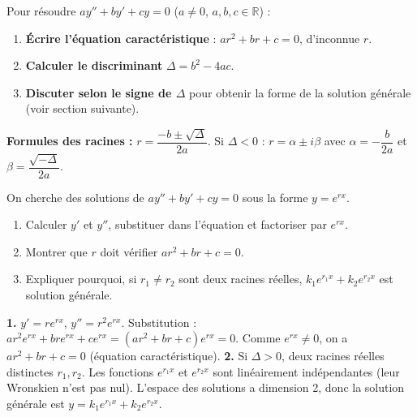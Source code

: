 \documentclass[11pt]{article}
\begin{document}
\begin{methode}
Pour résoudre $ay'' + by' + cy = 0$ ($a \neq 0$, $a,b,c \in \mathbb{R}$) :
\begin{enumerate}
\item \textbf{Écrire l'équation caractéristique} : $ar^2 + br + c = 0$, d'inconnue $r$.
\item \textbf{Calculer le discriminant} $\Delta = b^2 - 4ac$.
\item \textbf{Discuter selon le signe de $\Delta$} pour obtenir la forme de la solution générale (voir section suivante).
\end{enumerate}
\textbf{Formules des racines :} $r = \dfrac{-b \pm \sqrt{\Delta}}{2a}$.
Si $\Delta < 0$ : $r = \alpha \pm i\beta$ avec $\alpha = -\dfrac{b}{2a}$ et $\beta = \dfrac{\sqrt{-\Delta}}{2a}$.
\end{methode}

\begin{experience}
On cherche des solutions de $ay''+by'+cy=0$ sous la forme $y = e^{rx}$.
\begin{enumerate}
\item Calculer $y'$ et $y''$, substituer dans l'équation et factoriser par $e^{rx}$.
\item Montrer que $r$ doit vérifier $ar^2+br+c=0$.
\item Expliquer pourquoi, si $r_1 \neq r_2$ sont deux racines réelles, $k_1 e^{r_1 x} + k_2 e^{r_2 x}$ est solution générale.
\end{enumerate}
\tcblower
\textbf{1.} $y' = r e^{rx}$, $y'' = r^2 e^{rx}$. Substitution : $a r^2 e^{rx} + b r e^{rx} + c e^{rx} = (ar^2+br+c)e^{rx}=0$.
Comme $e^{rx} \neq 0$, on a $ar^2+br+c=0$ (équation caractéristique).
\textbf{2.} Si $\Delta > 0$, deux racines réelles distinctes $r_1, r_2$. Les fonctions $e^{r_1 x}$ et $e^{r_2 x}$ sont linéairement indépendantes (leur Wronskien n'est pas nul). L'espace des solutions a dimension 2, donc la solution générale est $y = k_1 e^{r_1 x} + k_2 e^{r_2 x}$.
\end{experience}
\end{document}
